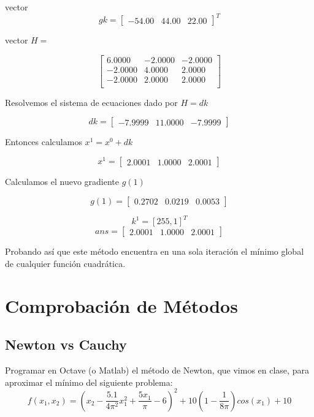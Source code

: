 \documentclass[12pt]{article}
\begin{document}
vector \[gk = \begin{bmatrix}
    -54.00 & 44.00 & 22.00 
\end{bmatrix}^T\]

vector $H=$

\[
\begin{bmatrix}
    6.0000 &  -2.0000  & -2.0000\\
    -2.0000   & 4.0000  &  2.0000\\
    -2.0000   & 2.0000  &  2.0000\\
\end{bmatrix}
\] 

Resolvemos el sistema de ecuaciones dado por $H=dk$

\[
    dk=  \begin{bmatrix}
        -7.9999  & 11.0000 &   -7.9999
    \end{bmatrix}  
\]


Entonces calculamos $x^1 = x^0+dk$

\[
    x^1=    \begin{bmatrix}
        2.0001   & 1.0000   & 2.0001
    \end{bmatrix}
\]

Calculamos el nuevo gradiente $g(1)$

\[
    g(1)= \begin{bmatrix}
        0.2702 &   0.0219 &    0.0053
    \end{bmatrix}
\]

\[
    k^1=[255,1]^T
\]
\[
    ans = \begin{bmatrix}
        2.0001  & 1.0000  & 2.0001
    \end{bmatrix}
\]

Probando así que este método encuentra en una sola iteración el mínimo global de cualquier función cuadrática.

\section{Comprobación de Métodos}
\subsection{Newton vs Cauchy}

Programar en Octave (o Matlab) el método de Newton, que vimos en clase, para aproximar el mínimo del siguiente problema:
	\[f(x_1,x_2)=\left(x_2-\dfrac{5.1}{4\pi^2}x_1^2+\dfrac{5x_1}{\pi}-6\right)^2+10\left(1-\dfrac{1}{8\pi}\right)cos(x_1)+10\]
	
\end{document}
